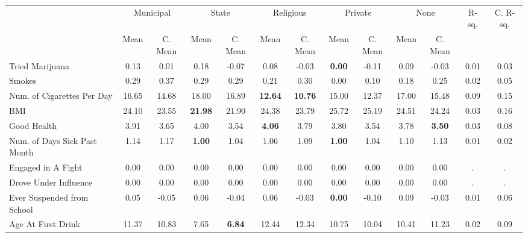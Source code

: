 \begin{tabular}{l c c c c c c c c c c c c}
\toprule
& \multicolumn{2}{c}{Municipal} & \multicolumn{2}{c}{State} & \multicolumn{2}{c}{Religious} & \multicolumn{2}{c}{Private} & \multicolumn{2}{c}{None} & R-sq. & C. R-sq. \\
& \scriptsize Mean & \scriptsize C. Mean & \scriptsize Mean & \scriptsize C. Mean & \scriptsize Mean & \scriptsize C. Mean & \scriptsize Mean & \scriptsize C. Mean & \scriptsize Mean & \scriptsize C. Mean & & \\
\midrule
Tried Marijuana &      0.13 & 0.01 &      0.18 & -0.07 &      0.08 & -0.03 & \textbf{     0.00} & -0.11 &      0.09 & -0.03 &      0.01 &      0.03 \\
Smokes &      0.29 & 0.37 &      0.29 & 0.29 &      0.21 & 0.30 &      0.00 & 0.10 &      0.18 & 0.25 &      0.02 &      0.05 \\
Num. of Cigarettes Per Day &     16.65 & 14.68 &     18.00 & 16.89 & \textbf{    12.64} & \textbf{    10.76} &     15.00 & 12.37 &     17.00 & 15.48 &      0.09 &      0.15 \\
BMI &     24.10 & 23.55 & \textbf{    21.98} & 21.90 &     24.38 & 23.79 &     25.72 & 25.19 &     24.51 & 24.24 &      0.03 &      0.16 \\
Good Health &      3.91 & 3.65 &      4.00 & 3.54 & \textbf{     4.06} & 3.79 &      3.80 & 3.54 &      3.78 & \textbf{     3.50} &      0.03 &      0.08 \\
Num. of Days Sick Past Month &      1.14 & 1.17 & \textbf{     1.00} & 1.04 &      1.06 & 1.09 & \textbf{     1.00} & 1.04 &      1.10 & 1.13 &      0.01 &      0.02 \\
Engaged in A Fight &      0.00 & 0.00 &      0.00 & 0.00 &      0.00 & 0.00 &      0.00 & 0.00 &      0.00 & 0.00 &         . &         . \\
Drove Under Influence &      0.00 & 0.00 &      0.00 & 0.00 &      0.00 & 0.00 &      0.00 & 0.00 &      0.00 & 0.00 &         . &         . \\
Ever Suspended from School &      0.05 & -0.05 &      0.06 & -0.04 &      0.06 & -0.03 & \textbf{     0.00} & -0.10 &      0.09 & -0.03 &      0.01 &      0.06 \\
Age At First Drink &     11.37 & 10.83 &      7.65 & \textbf{     6.84} &     12.44 & 12.34 &     10.75 & 10.04 &     10.41 & 11.23 &      0.02 &      0.09 \\
\bottomrule
\end{tabular}
